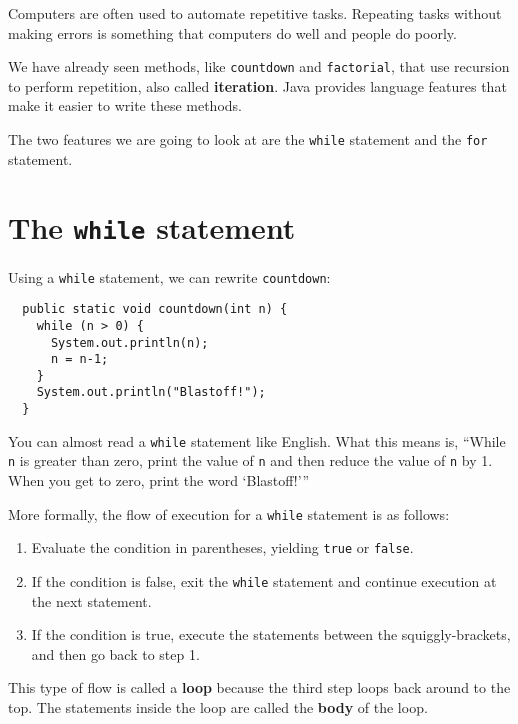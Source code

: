 \documentclass[12pt]{book}
\theoremstyle{definition}
\begin{document}
Computers are often used to automate repetitive tasks.  Repeating
tasks without making errors is something that
computers do well and people do poorly.

We have already seen methods, like {\tt countdown} and {\tt factorial},
 that use recursion to perform repetition, also called
{\bf iteration}.  Java provides language features that make
it easier to write these methods.

The two features we are going to look at are the {\tt while}
statement and the {\tt for} statement.

\section{The {\tt while} statement}

Using a {\tt while} statement, we can rewrite {\tt countdown}:

\begin{lstlisting}
  public static void countdown(int n) {
    while (n > 0) {
      System.out.println(n);
      n = n-1;
    }
    System.out.println("Blastoff!");
  }
\end{lstlisting}
%
You can almost read a {\tt while} statement like
English.  What this means is, ``While {\tt n} is greater than
zero, print the value of {\tt n} and then reduce
the value of {\tt n} by 1.  When you get to zero, print the
word `Blastoff!'''

More formally, the flow of execution for a {\tt while} statement
is as follows:

\begin{enumerate}

\item Evaluate the condition in parentheses, yielding {\tt true}
or {\tt false}.

\item If the condition is false, exit the {\tt while} statement
and continue execution at the next statement.

\item If the condition is true, execute the statements
between the squiggly-brackets, and then go back to step 1.

\end{enumerate}

This type of flow is called a {\bf loop} because the third step loops
back around to the top.  The statements inside the loop are called
the {\bf body} of the loop.
\end{document}
